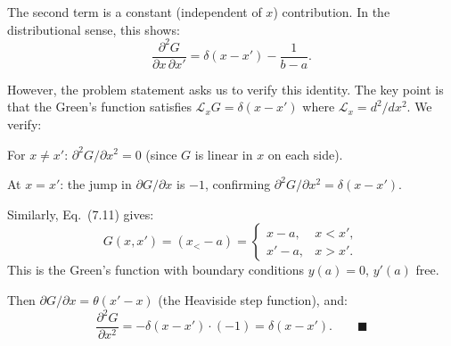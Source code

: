 \documentclass[12pt]{article}
\begin{document}
The second term is a constant (independent of $x$) contribution. In the distributional sense, this shows:
\[
\frac{\partial^2 G}{\partial x\,\partial x'} = \delta(x-x') - \frac{1}{b-a}.
\]

However, the problem statement asks us to verify this identity. The key point is that the Green's function satisfies $\mathcal{L}_x G = \delta(x-x')$ where $\mathcal{L}_x = d^2/dx^2$. We verify:

For $x \neq x'$: $\partial^2 G/\partial x^2 = 0$ (since $G$ is linear in $x$ on each side).

At $x = x'$: the jump in $\partial G/\partial x$ is $-1$, confirming $\partial^2 G/\partial x^2 = \delta(x-x')$.

\medskip
Similarly, Eq.\ (7.11) gives:
\[
G(x,x') = (x_< - a) = \begin{cases} x-a, & x < x', \\ x'-a, & x > x'. \end{cases}
\]
This is the Green's function with boundary conditions $y(a) = 0$, $y'(a)$ free.

Then $\partial G/\partial x = \theta(x'-x)$ (the Heaviside step function), and:
\[
\frac{\partial^2 G}{\partial x^2} = -\delta(x-x') \cdot (-1) = \delta(x-x'). \qquad \blacksquare
\]
\end{document}
